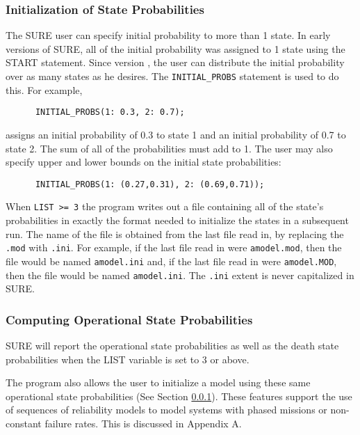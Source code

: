 \subsubsection{Initialization of State Probabilities} \label{sec:isp}
 
The SURE user can specify initial probability to more than 1 state.  In early
versions of SURE, all of the initial probability was assigned to 1 state using
the {\isf START} statement.  Since version , the user can distribute the
initial probability over as many states as he desires.  The
\verb'INITIAL_PROBS' statement is used to do this.  For example,
\begin{verbatim}  
      INITIAL_PROBS(1: 0.3, 2: 0.7);
\end{verbatim}  
assigns an initial probability of 0.3 to state 1 and an initial probability of
0.7 to state 2.  The sum of all of the probabilities must add to 1.  The user
may also specify upper and lower bounds on the initial state probabilities:
\begin{verbatim}  
      INITIAL_PROBS(1: (0.27,0.31), 2: (0.69,0.71));
\end{verbatim}  
 
When \verb|LIST >= 3| the program writes out a file containing all of the
state's probabilities in exactly the format needed to initialize the states in
a subsequent run.  The name of the file is obtained from the last file read
in, by replacing the \verb|.mod| with \verb|.ini|.  For example, if the last
file read in were \verb|amodel.mod|, then the file would be named
\verb|amodel.ini| and, if the last file read in were \verb|amodel.MOD|, then
the file would be named \verb|amodel.ini|.  The
\verb|.ini| extent is never capitalized in SURE.

\subsubsection{Computing Operational State Probabilities}
 
SURE will report the operational state probabilities as well as the death
state probabilities when the {\isf LIST} variable is set to 3 or above.

The program also allows the user to initialize a model using these
same operational state probabilities (See Section \ref{sec:isp}).
These features support the use of sequences of reliability models to
model systems with phased missions or non-constant failure rates.  This is
discussed in Appendix A.
 

